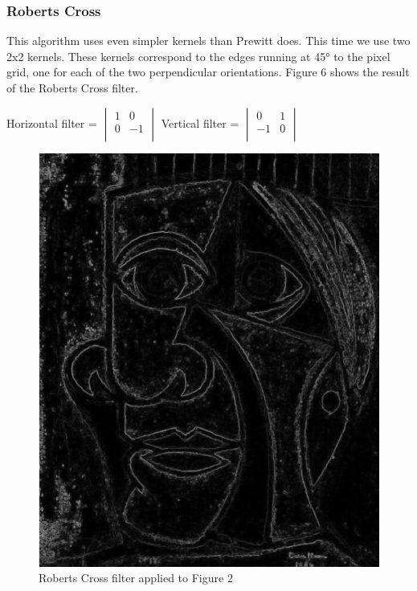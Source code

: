 \documentclass[12pt]{article}
\begin{document}
\subsubsection{Roberts Cross}
This algorithm uses even simpler kernels than Prewitt does. This time we use two 2x2 kernels. These kernels correspond to the edges running at 45° to the pixel grid, one for each of the two perpendicular orientations. Figure 6 shows the result of the Roberts Cross filter.
\newline

Horizontal filter = $\begin{vmatrix}
        1 & 0 \\
        0 & -1 \\
\end{vmatrix}$\hspace{11mm}
Vertical filter = $\begin{vmatrix}
        0 & 1\\
        -1 & 0\\
\end{vmatrix}$

\begin{figure}[h]
\centering
\includegraphics[scale = 0.39]{img/picassoRobertsCross}
\caption{Roberts Cross filter applied to Figure 2}
\end{figure}
\end{document}
